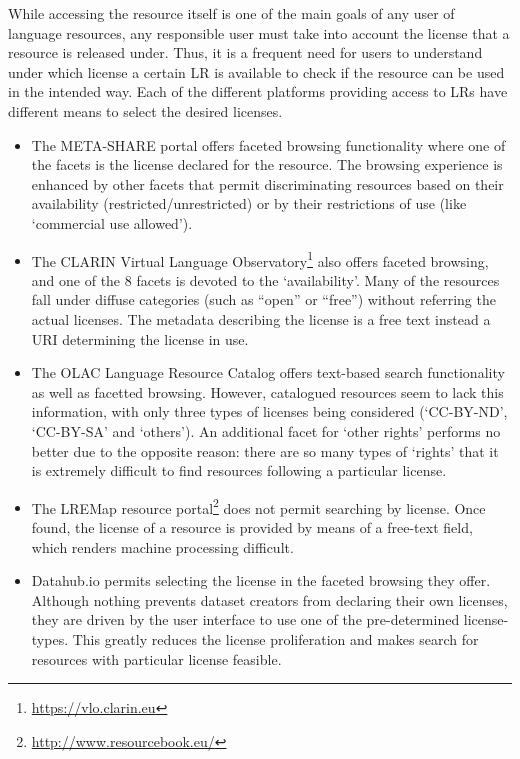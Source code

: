 \documentclass[smallextended]{svjour3}       %
\begin{document}
While accessing the resource itself is one of the main goals of any user of language resources, any
responsible user must take into account the license that a resource is
released under.  Thus, it is a frequent need for users to understand under which
license a certain LR is available to check if the resource can be used in the
intended way. 
Each of the different platforms providing access to LRs have different means to select the desired licenses. 
\begin{itemize}
    \item The META-SHARE portal offers faceted browsing functionality where one of
        the facets is the license declared for the resource. The browsing experience
        is enhanced by other facets that permit discriminating resources based on
        their availability (restricted/unrestricted) or by their restrictions of use
        (like `commercial use allowed').  
    \item The CLARIN Virtual Language Observatory\footnote{\url{https://vlo.clarin.eu}} also
        offers faceted browsing, and one of the 8 facets is devoted to the
        `availability'. Many of the resources fall under diffuse categories (such as
        ``open'' or ``free'') without referring the actual licenses. The
        metadata describing the license is a free text instead a URI determining
        the license in use. 
    \item The OLAC Language Resource Catalog offers text-based search functionality
        as well as facetted browsing. However, catalogued resources seem to lack
        this information, with only three types of licenses being considered
        (`CC-BY-ND', `CC-BY-SA' and `others'). An additional facet for `other
        rights' performs no better due to the opposite reason: there are so many
        types of `rights' that it is extremely difficult to find resources following
        a particular license. 
    \item The LREMap resource portal\footnote{\url{http://www.resourcebook.eu/}}
        does not permit searching by license. Once found, the license of a
        resource is provided by means of a free-text field, which renders
        machine processing difficult.  
    \item Datahub.io permits selecting the license in the faceted browsing they
        offer. Although nothing prevents dataset creators from declaring their
        own licenses, they are driven by the user interface to use one of the
        pre-determined license-types. This greatly reduces the license
        proliferation and makes search for resources with particular license
        feasible.
\end{itemize}
\end{document}
